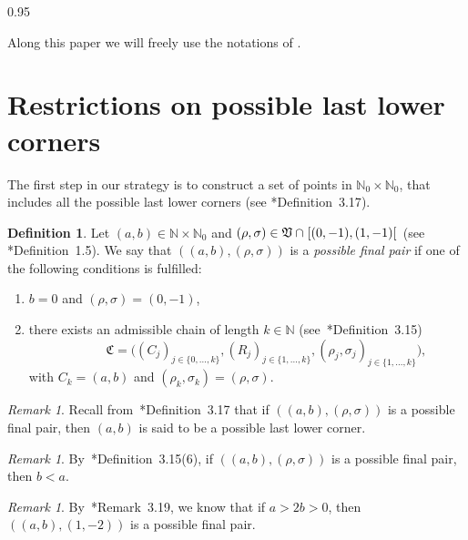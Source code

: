 \documentclass[reqno,a4paper,twoside]{amsart}
\theoremstyle{definition}
\newtheorem{definition}[theorem]{Definition}
\theoremstyle{remark}
\newtheorem{remark}[theorem]{Remark}
\begin{document}
\begin{spacing}{0.95}
\smallskip

Along this paper we will freely use the notations of \cite{GGV1}.


\section{Restrictions on possible last lower corners}

The first step in our strategy is to construct a set of points in $\mathds{N}_0\times \mathds{N}_0$, that includes all the possible last lower corners (see \cite{GGV2}*{Definition~3.17}).

\smallskip

\begin{definition}
Let $(a,b)\in \mathds{N}\times \mathds{N}_0$ and $(\rho,\sigma)\in\mathfrak{V}\cap \hspace{0.7pt}[(0,-1),(1,-1)[\hspace{0.7pt}$ (see \cite{GGV1}*{Definition~1.5}). We say that $((a,b),(\rho,\sigma))$ is a {\em possible final pair} if one of the following conditions is fulfilled:

\begin{enumerate}[itemsep=0.5ex,topsep=0.5ex]

\item $b=0$ and $(\rho,\sigma) = (0,-1)$,

\item there exists an admissible chain of length $k\in\mathds{N}$ (see~\cite{GGV2}*{Definition~3.15})
$$
\qquad\quad\mathfrak{C}=\bigl((C_j)_{j\in\{0,\dots,k\}},(R_j)_{j\in\{1,\dots,k\}},(\rho_j,\sigma_j)_{j\in\{1,\dots,k\}}\bigr),
$$
with $C_k = (a,b)$ and $(\rho_k,\sigma_k) = (\rho,\sigma)$.

\end{enumerate}
\end{definition}

\begin{remark}
Recall from~\cite{GGV2}*{Definition~3.17} that if $((a,b),(\rho,\sigma))$ is a possible final pair, then $(a,b)$ is said to be a possible last lower corner.
\end{remark}

\begin{remark}
By~\cite{GGV2}*{Definition~3.15(6)}, if $((a,b),(\rho,\sigma))$ is a possible final pair, then $b<a$.
\end{remark}

\begin{remark}
By~\cite{GGV2}*{Remark~3.19}, we know that if $a > 2b> 0$, then $((a,b),(1,-2))$ is a possible final pair.
\end{remark}


\end{spacing}
\end{document}

